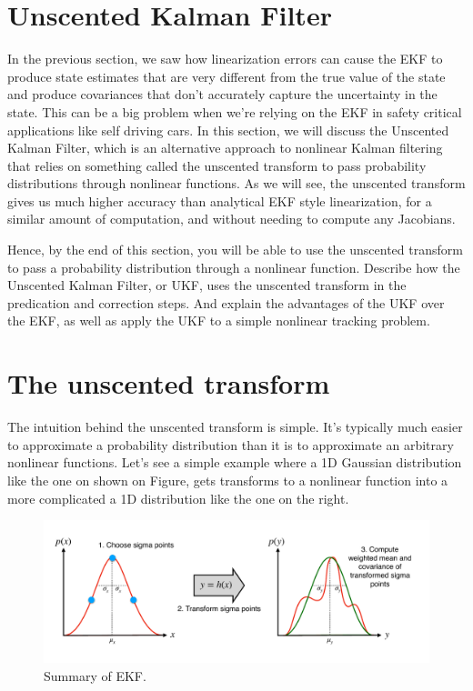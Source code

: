 \section{Unscented Kalman Filter}
\label{unscented_kalman_filter}

In the previous section, we saw how linearization errors can cause the EKF to produce state estimates that are very different from
the true value of the state and produce covariances that don't accurately
capture the uncertainty in the state. This can be a big problem when we're relying on the EKF in safety critical applications
like self driving cars. In this section, we will discuss the Unscented Kalman
Filter, which is an alternative approach to nonlinear Kalman filtering that
relies on something called the unscented transform to pass probability
distributions through nonlinear functions. As we will see, the unscented transform
gives us much higher accuracy than analytical EKF style linearization,
for a similar amount of computation, and without needing to compute any Jacobians. 

Hence, by the end of this section, you will be able to use the unscented transform to pass a probability distribution
through a nonlinear function. Describe how the Unscented Kalman Filter, or UKF, uses the unscented transform in
the predication and correction steps. And explain the advantages
of the UKF over the EKF, as well as apply the UKF to a simple
nonlinear tracking problem. 

\section{The unscented transform}
\label{unscented_transform}

The intuition behind the unscented
transform is simple. It's typically much easier to approximate a probability distribution than it is to approximate an arbitrary
nonlinear functions. Let's see  a simple example where a 1D Gaussian distribution like the one on shown on Figure, gets transforms
to a nonlinear function into a more complicated a 1D distribution
like the one on the right. 

\begin{figure}[!htb]
\begin{center}
\includegraphics[scale=0.280]{img/kalman_filter/unscented_kalman_filter_1.jpeg}
\end{center}
\caption{Summary of EKF.}
\label{unscented_kalman_filter_1}
\end{figure}

